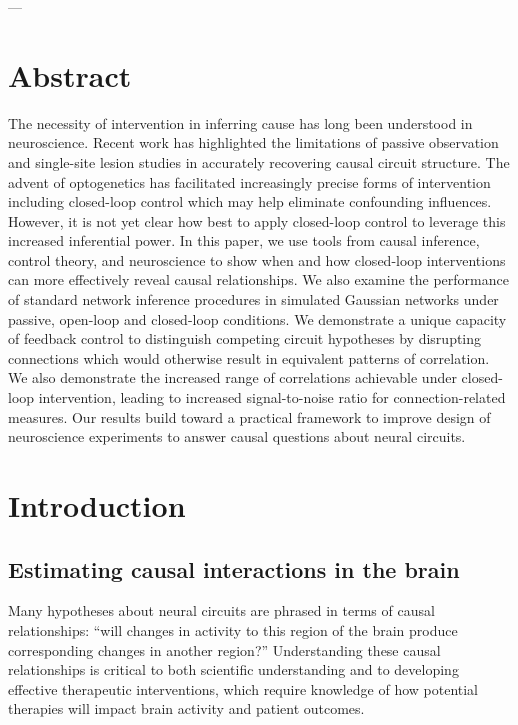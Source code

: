 \documentclass{article}
\begin{document}
---
\hypertarget{abstract}{%
\section{Abstract}\label{abstract}}

The necessity of intervention in inferring cause has long been understood in neuroscience. Recent work has highlighted the limitations of passive observation and single-site lesion studies in accurately recovering causal circuit structure. The advent of optogenetics has facilitated increasingly precise forms of intervention including closed-loop control which may help eliminate confounding influences. However, it is not yet clear how best to apply closed-loop control to leverage this increased inferential power. In this paper, we use tools from causal inference, control theory, and neuroscience to show when and how closed-loop interventions can more effectively reveal causal relationships. We also examine the performance of standard network inference procedures in simulated Gaussian networks under passive, open-loop and closed-loop conditions. We demonstrate a unique capacity of feedback control to distinguish competing circuit hypotheses by disrupting connections which would otherwise result in equivalent patterns of correlation. We also demonstrate the increased range of correlations achievable under closed-loop intervention, leading to increased signal-to-noise ratio for connection-related measures. Our results build toward a practical framework to improve design of neuroscience experiments to answer causal questions about neural circuits.

\hypertarget{introduction}{%
\section{Introduction}\label{introduction}}

\hypertarget{estimating-causal-interactions-in-the-brain}{%
\subsection{Estimating causal interactions in the brain}\label{estimating-causal-interactions-in-the-brain}}

Many hypotheses about neural circuits are phrased in terms of causal relationships: ``will changes in activity to this region of the brain produce corresponding changes in another region?'' Understanding these causal relationships is critical to both scientific understanding and to developing effective therapeutic interventions, which require knowledge of how potential therapies will impact brain activity and patient outcomes.
\end{document}

